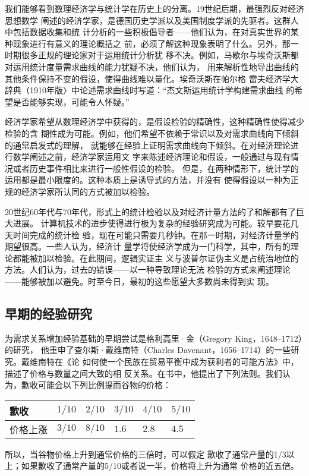 我们能够看到数理经济学与统计学在历史上的分离。19世纪后期，最强烈反对经济思想数学
阐述的经济学家，是德国历史学派以及美国制度学派的先驱者。这群人中包括数据收集和统
计分析的一些积极倡导者——他们认为，在对真实世界的某种现象进行有意义的理论概括之
前，必须了解这种现象表明了什么。另外，那一时期很多正规的理论家对于运用统计分析犹
移不决。例如，马歇尔与埃奇沃斯都对运用统计度量需求曲线的能力犹疑不决，他们认为，
用来解析性地导出曲线的其他条件保持不变的假设，使得曲线难以量化。埃奇沃斯在帕尔格
雷夫经济学大辞典（1910年版〉中论述需求曲线时写道：“杰文斯运用统计学构建需求曲线
的希望是否能够实现，可能令人怀疑。”

经济学家希望从数理经济学中获得的，是假设检验的精确性，这种精确性使得减少检验的含
糊性成为可能。例如，他们希望不依赖于常识以及对需求曲线向下倾斜的通常启发式的理解，
就能够在经验上证明需求曲线向下倾斜。在对经济理论进行数学阐述之前，经济学家运用文
字来陈述经济理论和假设，一般通过与现有情况或者历史事件相比来进行一般性假设的检验。
但是，在两种情形下，统计学的运用都是最小限度的。这种本质上是诱导式的方法，并没有
使得假设以一种为正规的经济学家所认同的方式被加以检验。

20世纪60年代与70年代，形式上的统计检验以及对经济计量方法的了和解都有了巨大进展。
计算机技术的进步使得进行极为复杂的经验研究成为可能。较早要花几天时间完成的统计检
验，现在可能只需要几秒钟。在那一时期，对经济计量学的期望很高。一些人认为，经济计
量学将使经济学成为一门科学，其中，所有的理论都能被加以检验。在此期间，逻辑实证主
义与波普尔证伪主义是占统治地位的方法。人们认为，过去的错误——以一种导致理论无法
检验的方式来阐述理论——能够被加以避免。时至今日，最初的这些愿望大多数尚未得到实
现。

\subsection{早期的经验研究}

为需求关系增加经验基础的早期尝试是格利高里·金（Gregory King，1648--1712）的研究，
他重申了查尔斯·戴维南特（Charles Davenant，1656--1714）的一些研究。戴维南特在《论
如何使一个民族在贸易平衡中成为获利者的可能方法》中，描述了价格与数量之间大致的相
反关系。在书中，他提出了下列法则。我们认为，歉收可能会以下列比例提而谷物的价格：

\begin{table}[htbp]
  \centering
    \begin{tabularx}{.9\linewidth}{@{}|l|X|X|X|X|X|@{}}
      \hline
    歉收    & $1/10$ & $2/10$ & $3/10$ & $4/10$ & $5/10$ \\ \hline
    价格上涨 & $3/10$ & $8/10$ & $1.6$ & $2.8$ & $4.5$ \\ \hline
    \end{tabularx}%

    \bigskip \raggedright\small 所以，当谷物价格上升到通常价格的三倍时，可以假定
    歉收了通常产量的1/3以上；如果歉收了通常产量的5/10或者说一半，价格将上升为通常
    价格的近五倍。
\end{table}

